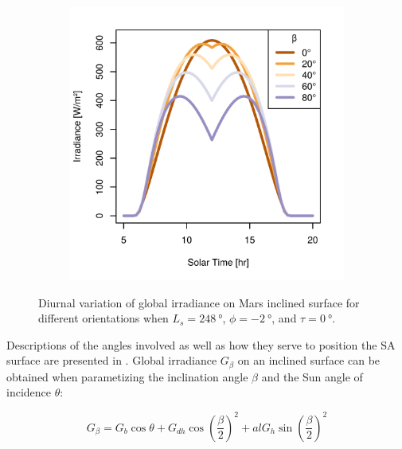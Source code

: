 \begin{figure}[h]
\begin{subfigure}[t]{\subfigureWidth}
  		\label{fig:sub:irradiance-inclined-gamma-c-m180}
  	\end{subfigure}\hfill
	   \begin{subfigure}[t]{\subfigureWidth}
      \centering
  		\includegraphics[height=\graphicsHeight]{sections/mars-solar-energy/solar-radiation/plots/gi-variationfor-ls-248-phi-2-tau-05-gammac-west-and-albedo-027.png}
  		\label{fig:sub:irradiance-inclined-gamma-c-90}
	   \end{subfigure}\hfill
	\caption{Diurnal variation of global irradiance on Mars inclined surface for different orientations when $L_{s} = \SI{248}{\degree}$, $\phi = \SI{-2}{\degree}$, and $\tau = \SI{0}{\degree}$.}
	\label{fig:plot:irradiance-inclined-gamma-c}
\vspace{-2ex}
\end{figure}

Descriptions of the angles involved as well as how they serve to position the \ac{SA} surface are presented in . Global irradiance $G_{\beta}$ on an inclined surface can be obtained when parametizing the inclination angle $\beta$ and the Sun angle of incidence $\theta$:

\begin{equation}
  \label{eq:G_beta}
  G_{\beta} = G_{b}\cos{\theta} + G_{dh}\cos{\left(\frac{\beta}{2}\right)}^2 + al G_{h} \sin{\left(\frac{\beta}{2}\right)}^2
\end{equation}

